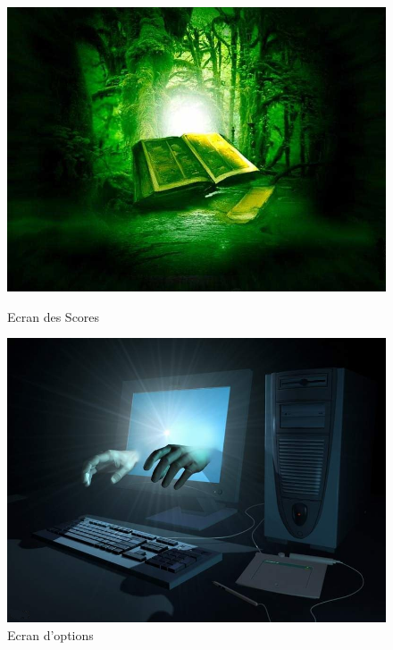 \begin{figure}[H]
   \begin{minipage}[c]{.46\linewidth}
      \includegraphics[scale=0.3]{img/livre.jpg}
			\caption {Ecran des Scores} 
   \end{minipage} \hfil
   \begin{minipage}[c]{.46\linewidth}
      \includegraphics[scale=0.3]{img/option.jpg}
			\caption {Ecran d'options} 
   \end{minipage}
\end{figure}
